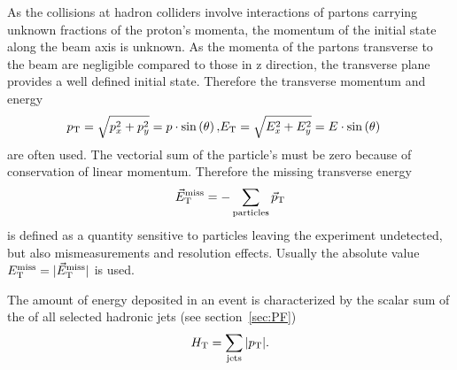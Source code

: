 As the collisions at hadron colliders involve interactions of partons carrying unknown fractions of the proton's momenta, the momentum of the initial state along the beam axis is unknown. As the momenta of the partons transverse to the beam are negligible compared to those in z direction, the transverse plane provides a well defined initial state. Therefore the transverse momentum and energy
\begin{eqnarray}
p_{\mathrm{T}} = \sqrt{p_x^2  + p_y^2} = p\cdot \sin\left(\theta\right), & E_{\mathrm{T}} = \sqrt{E_x^2  + E_y^2} = E\cdot \sin\left(\theta\right)
\end{eqnarray}
are often used. The vectorial sum of the particle's \pt must be zero because of conservation of linear momentum. Therefore the missing transverse energy 
\begin{equation}
\vec{E}_{\mathrm{T}}^{\mathrm{miss}} = - \sum\limits_{\text{particles}} \vec{p}_{\mathrm{T}}
\end{equation}
is defined as a quantity sensitive to particles leaving the experiment undetected, but also mismeasurements and resolution effects. Usually the absolute value $E_{\mathrm{T}}^{\mathrm{miss}} = \vert \vec{E}_{\mathrm{T}}^{\mathrm{miss}} \vert$ is used.

The amount of energy deposited in an event is characterized by the scalar sum of the \pt of all selected hadronic jets (see section~\ref{sec:PF}) 
\begin{equation}
H_\mathrm{T} = \sum\limits_{\text{jets}} \vert p_{\mathrm{T}} \vert.
\end{equation}

